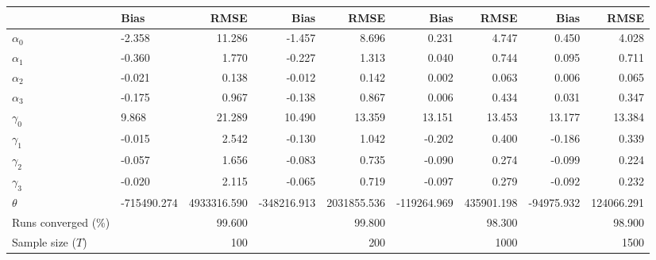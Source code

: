 
\begin{tabular}[t]{llrrrrrrr}
\toprule
  & Bias & RMSE & Bias & RMSE & Bias & RMSE & Bias & RMSE\\
\midrule
$\alpha_{0}$ & -2.358 & 11.286 & -1.457 & 8.696 & 0.231 & 4.747 & 0.450 & 4.028\\
$\alpha_{1}$ & -0.360 & 1.770 & -0.227 & 1.313 & 0.040 & 0.744 & 0.095 & 0.711\\
$\alpha_{2}$ & -0.021 & 0.138 & -0.012 & 0.142 & 0.002 & 0.063 & 0.006 & 0.065\\
$\alpha_{3}$ & -0.175 & 0.967 & -0.138 & 0.867 & 0.006 & 0.434 & 0.031 & 0.347\\
$\gamma_{0}$ & 9.868 & 21.289 & 10.490 & 13.359 & 13.151 & 13.453 & 13.177 & 13.384\\
$\gamma_{1}$ & -0.015 & 2.542 & -0.130 & 1.042 & -0.202 & 0.400 & -0.186 & 0.339\\
$\gamma_{2}$ & -0.057 & 1.656 & -0.083 & 0.735 & -0.090 & 0.274 & -0.099 & 0.224\\
$\gamma_{3}$ & -0.020 & 2.115 & -0.065 & 0.719 & -0.097 & 0.279 & -0.092 & 0.232\\
$\theta$ & -715490.274 & 4933316.590 & -348216.913 & 2031855.536 & -119264.969 & 435901.198 & -94975.932 & 124066.291\\
Runs converged (\%) &  & 99.600 &  & 99.800 &  & 98.300 &  & 98.900\\
Sample size ($T$) &  & 100 &  & 200 &  & 1000 &  & 1500\\
\bottomrule
\end{tabular}
